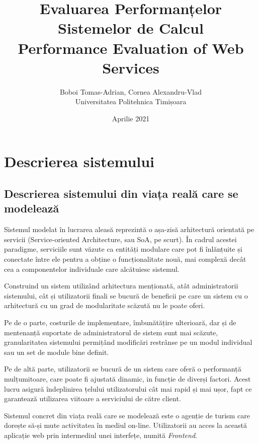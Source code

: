 \documentclass[12pt]{article}
\author{Boboi Tomas-Adrian, Cornea Alexandru-Vlad\\ Universitatea Politehnica Timișoara}
\date{Aprilie 2021}
\title{Evaluarea Performanțelor Sistemelor de Calcul\\ Performance Evaluation of Web Services}
\begin{document}
    \maketitle
    \thispagestyle{empty}
    \pagebreak

    \tableofcontents
    \pagebreak

    \section{Descrierea sistemului}

        \subsection{Descrierea sistemului din viața reală care se modelează}
            Sistemul modelat în lucrarea aleasă reprezintă o așa-zisă arhitectură orientată pe servicii (Service-oriented Architecture, sau SoA, pe scurt). În cadrul acestei paradigme, serviciile sunt văzute ca entități modulare care pot fi înlănțuite și conectate între ele pentru a obține o funcționalitate nouă, mai complexă decât cea a componentelor individuale care alcătuiesc sistemul.

            Construind un sistem utilizând arhitectura menționată, atât administratorii sistemului, cât și utilizatorii finali se bucură de beneficii pe care un sistem cu o arhitectură cu un grad de modularitate scăzută nu le poate oferi.

            Pe de o parte, costurile de implementare, îmbunătățire ulterioară, dar și de mentenanță suportate de administratorul de sistem sunt mai scăzute, granularitatea sistemului permițând modificări restrânse pe un modul individual sau un set de module bine definit.

            Pe de altă parte, utilizatorii se bucură de un sistem care oferă o per\-for\-man\-ță mulțumitoare, care poate fi ajustată dinamic, in funcție de diverși factori. Acest lucru asigură îndeplinirea țelului utilizatorului cât mai rapid și mai ușor, fapt ce garantează utilizarea viitoare a serviciului de către client.

            \vspace{\baselineskip}
            \noindent
            Sistemul concret din viața reală care se modelează este o agenție de turism care dorește să-și mute activitatea în mediul on-line. Utilizatorii au acces la această aplicație web prin intermediul unei interfețe, numită \textit{Frontend}.
\end{document}
